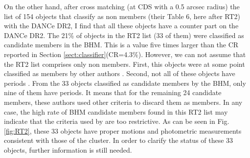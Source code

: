 On the other hand, after cross matching (at CDS with a 0.5 arcsec radius)  the list of 154 objects that \citet{Rebull2016} classify as non members (their Table 6, here after RT2) with the DANCe DR2, I find that all these objects have a counter part on the DANCe DR2. The 21\% of objects in the RT2 list (33 of them) were classified as candidate members in the BHM. This is a value five times larger than the CR reported in Section \ref{sect:classifier}(CR=4.3\%). However, we can not assume that the RT2 list comprises only non members. First, this objects were at some point classified as members by other authors \cite[Appendix B of][]{Rebull2016}. Second, not all of these objects have periods \cite[only 20\% according to][]{Rebull2016}. From the 33 objects classified as candidate members by the BHM, only nine of them have periods. It means that for the remaining 24 candidate members, these authors used other criteria to discard them as members. In any case, the high rate of BHM candidate members found in this RT2 list may indicate that the criteria used by \citet{Rebull2016} are too restrictive. As can be seen in Fig. \ref{fig:RT2}, these 33 objects have proper motions and photometric measurements consistent with those of the cluster. In order to clarify the status of these 33 objects, further information is still needed.


